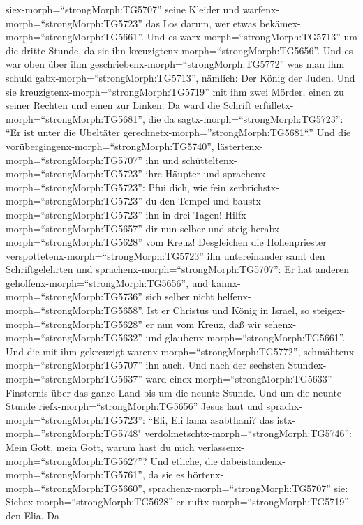 siex-morph=``strongMorph:TG5707'' seine Kleider und
warfenx-morph=``strongMorph:TG5723'' das Los darum, wer etwas
bekämex-morph=``strongMorph:TG5661''.  Und es
warx-morph=``strongMorph:TG5713'' um die dritte Stunde, da sie ihn
kreuzigtenx-morph=``strongMorph:TG5656''.  Und es war oben
über ihm geschriebenx-morph=``strongMorph:TG5772'' was man ihm schuld
gabx-morph=``strongMorph:TG5713'', nämlich: Der König der Juden.
 Und sie kreuzigtenx-morph=``strongMorph:TG5719'' mit ihm
zwei Mörder, einen zu seiner Rechten und einen zur Linken. 
Da ward die Schrift erfülletx-morph=``strongMorph:TG5681'', die da
sagtx-morph=``strongMorph:TG5723'': ``Er ist unter die Übeltäter
gerechnetx-morph=''strongMorph:TG5681``.''  Und die
vorübergingenx-morph=``strongMorph:TG5740'',
lästertenx-morph=``strongMorph:TG5707'' ihn und
schütteltenx-morph=``strongMorph:TG5723'' ihre Häupter und
sprachenx-morph=``strongMorph:TG5723'': Pfui dich, wie fein
zerbrichstx-morph=``strongMorph:TG5723'' du den Tempel und
baustx-morph=``strongMorph:TG5723'' ihn in drei Tagen! 
Hilfx-morph=``strongMorph:TG5657'' dir nun selber und steig
herabx-morph=``strongMorph:TG5628'' vom Kreuz!  Desgleichen
die Hohenpriester verspottetenx-morph=``strongMorph:TG5723'' ihn
untereinander samt den Schriftgelehrten und
sprachenx-morph=``strongMorph:TG5707'': Er hat anderen
geholfenx-morph=``strongMorph:TG5656'', und
kannx-morph=``strongMorph:TG5736'' sich selber nicht
helfenx-morph=``strongMorph:TG5658''.  Ist er Christus und
König in Israel, so steigex-morph=``strongMorph:TG5628'' er nun vom
Kreuz, daß wir sehenx-morph=``strongMorph:TG5632'' und
glaubenx-morph=``strongMorph:TG5661''. Und die mit ihm gekreuzigt
warenx-morph=``strongMorph:TG5772'',
schmähtenx-morph=``strongMorph:TG5707'' ihn auch.  Und nach
der sechsten Stundex-morph=``strongMorph:TG5637'' ward
einex-morph=``strongMorph:TG5633'' Finsternis über das ganze Land bis um
die neunte Stunde.  Und um die neunte Stunde
riefx-morph=``strongMorph:TG5656'' Jesus laut und
sprachx-morph=``strongMorph:TG5723'': ``Eli, Eli lama asabthani? das
istx-morph=''strongMorph:TG5748"
verdolmetschtx-morph=``strongMorph:TG5746'': Mein Gott, mein Gott, warum
hast du mich verlassenx-morph=``strongMorph:TG5627''?  Und
etliche, die dabeistandenx-morph=``strongMorph:TG5761'', da sie es
hörtenx-morph=``strongMorph:TG5660'',
sprachenx-morph=``strongMorph:TG5707'' sie:
Siehex-morph=``strongMorph:TG5628'' er
ruftx-morph=``strongMorph:TG5719'' den Elia.  Da

